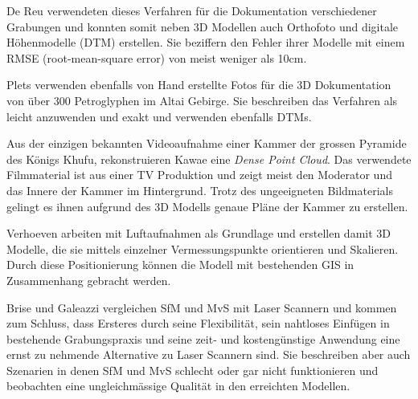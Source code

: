 			De Reu \etal{} verwendeten dieses Verfahren für die Dokumentation verschiedener Grabungen und konnten somit neben 3D Modellen auch Orthofoto und digitale Höhenmodelle (DTM) erstellen. Sie beziffern den Fehler ihrer Modelle mit einem RMSE (root-mean-square error) von meist weniger als 10cm.
			
			Plets \etal{} verwenden ebenfalls von Hand erstellte Fotos für die 3D Dokumentation von über 300 Petroglyphen im Altai Gebirge. Sie beschreiben das Verfahren als leicht anzuwenden und exakt und verwenden ebenfalls DTMs.
			
			Aus der einzigen bekannten Videoaufnahme einer Kammer der grossen Pyramide des Königs Khufu, rekonstruieren Kawae \etal{} eine \emph{Dense Point Cloud}. Das verwendete Filmmaterial ist aus einer TV Produktion und zeigt meist den Moderator und das Innere der Kammer im Hintergrund. Trotz des ungeeigneten Bildmaterials gelingt es ihnen aufgrund des 3D Modells genaue Pläne der Kammer zu erstellen.
			
			Verhoeven \etal{} arbeiten mit Luftaufnahmen als Grundlage und erstellen damit 3D Modelle, die sie mittels einzelner Vermessungspunkte orientieren und Skalieren. Durch diese Positionierung können die Modell mit bestehenden GIS in Zusammenhang gebracht werden.
			
			Brise \etal{} und Galeazzi \etal{} vergleichen SfM und MvS mit Laser Scannern und kommen zum Schluss, dass Ersteres durch seine Flexibilität, sein nahtloses Einfügen in bestehende Grabungspraxis und seine zeit- und kostengünstige Anwendung eine ernst zu nehmende Alternative zu Laser Scannern sind. Sie beschreiben aber auch Szenarien in denen SfM und MvS schlecht oder gar nicht funktionieren und beobachten eine ungleichmässige Qualität in den erreichten Modellen.